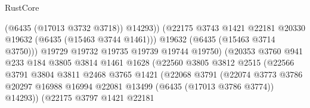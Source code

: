 \begin{lexlean}{RustCore}
\begin{coremodule}
                                            (@6435 (@17013 @3732 @3718))
                                            @14293))
                                        (@22175
                                          @3743
                                          @1421
                                          @22181
                                          @20330
                                          @19632
                                          (@6435 (@15463 @3744 @1461)))
                                        @19632
                                        (@6435 (@15463 @3714 @3750)))
                                      @19729
                                      @19732
                                      @19735
                                      @19739
                                      @19744
                                      @19750)
                                    (@20353
                                      @3760
                                      @941
                                      @233
                                      @184
                                      @3805
                                      @3814
                                      @1461
                                      @1628
                                      (@22560
                                        @3805
                                        @3812
                                        @2515
                                        (@22566
                                          @3791
                                          @3804
                                          @3811
                                          @2468
                                          @3765
                                          @1421
                                          (@22068
                                            @3791
                                            (@22074
                                              @3773
                                              @3786
                                              @20297
                                              @16988
                                              @16994
                                              @22081
                                              @13499
                                              (@6435 (@17013 @3786 @3774))
                                              @14293))
                                          (@22175
                                            @3797
                                            @1421
                                            @22181

\end{coremodule}
\end{lexlean}
